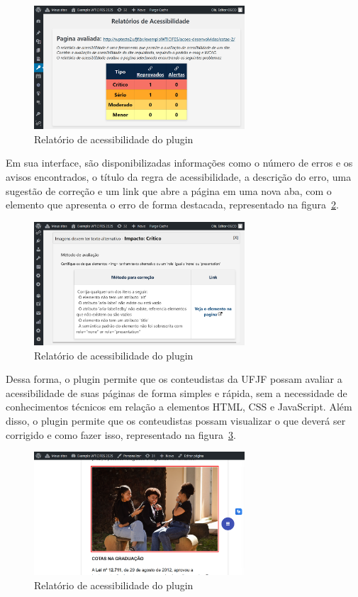 \documentclass[
	article,			%
	12pt,				%
	oneside,			%
	a4paper,			%
	section=TITLE,		%
	subsection=TITLE,	%
	english,			%
	brazil,				%
	sumario=tradicional
	]{abntex2}
\begin{document}
\begin{figure}[h]
    \centering
    \caption{Relatório de acessibilidade do plugin}
    \label{fig:relatorio}
\includegraphics[width=0.7\textwidth]{imagem2.png}
\end{figure}


Em sua interface, são disponibilizadas informações
como o número de erros e os avisos encontrados,
o título da regra de acessibilidade, a descrição do erro, uma sugestão de correção 
e um link que abre a página em uma nova aba, com o elemento que apresenta o erro de
forma destacada, representado na figura~\ref{fig:relatorio2}.

\begin{figure}[h]
    \centering
    \caption{Relatório de acessibilidade do plugin}
    \label{fig:relatorio2}
\includegraphics[width=0.7\textwidth]{imagem3.png}
\end{figure}

Dessa forma, o plugin permite que os conteudistas da UFJF possam avaliar a
acessibilidade de suas páginas de forma simples e rápida, sem a necessidade
de conhecimentos técnicos em relação a elementos HTML, CSS e JavaScript.
Além disso, o plugin permite que os conteudistas possam visualizar o que
deverá ser corrigido e como fazer isso, representado na figura~\ref{fig:relatorio3}.

\begin{figure}[h]
    \centering
    \caption{Relatório de acessibilidade do plugin}
    \label{fig:relatorio3}
\includegraphics[width=0.7\textwidth]{imagem4.png}
\end{figure}
\end{document}
